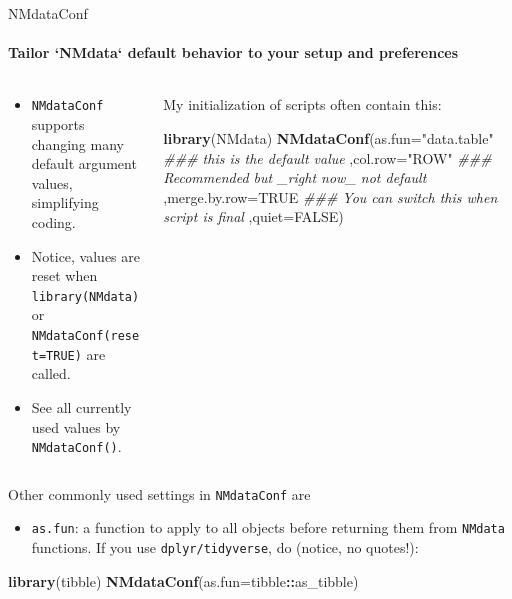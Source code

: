 \documentclass[
  8pt,
  ignorenonframetext,
  aspectratio=169]{beamer}
\newenvironment{Shaded}{\begin{snugshade}}{\end{snugshade}}
\newcommand{\CommentTok}[1]{\textcolor[rgb]{0.56,0.35,0.01}{\textit{#1}}}
\newcommand{\DataTypeTok}[1]{\textcolor[rgb]{0.13,0.29,0.53}{#1}}
\newcommand{\KeywordTok}[1]{\textcolor[rgb]{0.13,0.29,0.53}{\textbf{#1}}}
\newcommand{\NormalTok}[1]{#1}
\newcommand{\OperatorTok}[1]{\textcolor[rgb]{0.81,0.36,0.00}{\textbf{#1}}}
\newcommand{\OtherTok}[1]{\textcolor[rgb]{0.56,0.35,0.01}{#1}}
\newcommand{\StringTok}[1]{\textcolor[rgb]{0.31,0.60,0.02}{#1}}
\providecommand{\tightlist}{%
  \setlength{\itemsep}{0pt}\setlength{\parskip}{0pt}}
\begin{document}
\begin{frame}[fragile]{NMdataConf}
\protect\hypertarget{nmdataconf}{}
\framesubtitle{Tailor `NMdata` default behavior to your setup and preferences}

\begin{columns}[T]
\begin{column}{0.48\textwidth}
\begin{itemize}
\item
  \texttt{NMdataConf} supports changing many default argument values,
  simplifying coding.
\item
  Notice, values are reset when \texttt{library(NMdata)} or
  \texttt{NMdataConf(reset=TRUE)} are called.
\item
  See all currently used values by \texttt{NMdataConf()}.
\end{itemize}
\end{column}

\begin{column}{0.48\textwidth}
My initialization of scripts often contain this:

\begin{Shaded}
\begin{Highlighting}[]
\KeywordTok{library}\NormalTok{(NMdata)}
\KeywordTok{NMdataConf}\NormalTok{(}\DataTypeTok{as.fun=}\StringTok{"data.table"}
\CommentTok{\#\#\# this is the default value}
\NormalTok{          ,}\DataTypeTok{col.row=}\StringTok{"ROW"}
\CommentTok{\#\#\# Recommended but \_right now\_ not default}
\NormalTok{          ,}\DataTypeTok{merge.by.row=}\OtherTok{TRUE}
\CommentTok{\#\#\# You can switch this when script is final}
\NormalTok{          ,}\DataTypeTok{quiet=}\OtherTok{FALSE}\NormalTok{)}
\end{Highlighting}
\end{Shaded}
\end{column}
\end{columns}

Other commonly used settings in \texttt{NMdataConf} are

\begin{itemize}
\tightlist
\item
  \texttt{as.fun}: a function to apply to all objects before returning
  them from \texttt{NMdata} functions. If you use
  \texttt{dplyr/tidyverse}, do (notice, no quotes!):
\end{itemize}

\begin{Shaded}
\begin{Highlighting}[]
\KeywordTok{library}\NormalTok{(tibble)}
\KeywordTok{NMdataConf}\NormalTok{(}\DataTypeTok{as.fun=}\NormalTok{tibble}\OperatorTok{::}\NormalTok{as\_tibble)}
\end{Highlighting}
\end{Shaded}


\end{frame}
\end{document}
